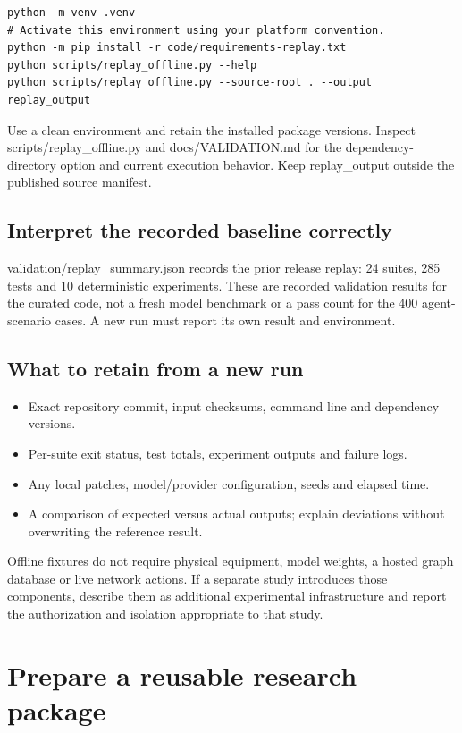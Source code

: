 \begin{Verbatim}[fontsize=\footnotesize,breaklines=true,frame=single,rulecolor=\color{rulegray},framesep=8pt]
python -m venv .venv
# Activate this environment using your platform convention.
python -m pip install -r code/requirements-replay.txt
python scripts/replay_offline.py --help
python scripts/replay_offline.py --source-root . --output replay_output
\end{Verbatim}
Use a clean environment and retain the installed package versions. Inspect scripts/replay\_offline.py and docs/VALIDATION.md for the dependency-directory option and current execution behavior. Keep replay\_output outside the published source manifest.

\subsection*{Interpret the recorded baseline correctly}
validation/replay\_summary.json records the prior release replay: 24 suites, 285 tests and 10 deterministic experiments. These are recorded validation results for the curated code, not a fresh model benchmark or a pass count for the 400 agent-scenario cases. A new run must report its own result and environment.

\subsection*{What to retain from a new run}
\begin{itemize}
\item Exact repository commit, input checksums, command line and dependency versions.
\item Per-suite exit status, test totals, experiment outputs and failure logs.
\item Any local patches, model/provider configuration, seeds and elapsed time.
\item A comparison of expected versus actual outputs; explain deviations without overwriting the reference result.
\end{itemize}
Offline fixtures do not require physical equipment, model weights, a hosted graph database or live network actions. If a separate study introduces those components, describe them as additional experimental infrastructure and report the authorization and isolation appropriate to that study.

\clearpage\section{Prepare a reusable research package}
